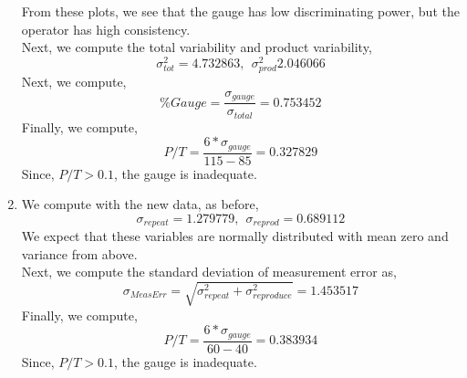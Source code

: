 \documentclass[letterpaper,10pt]{article}
\begin{document}
\begin{enumerate}
\begin{center}
\end{center}
From these plots, we see that the gauge has low discriminating power, but the operator has high consistency.\\
Next, we compute the total variability and product variability,
\[\sigma^2_{tot}=4.732863,\ \ \sigma^2_{prod}2.046066\]
Next, we compute,
\[\%Gauge=\frac{\sigma_{gauge}}{\sigma_{total}}=0.753452\]
Finally, we compute,
\[P/T=\frac{6*\sigma_{gauge}}{115-85}=0.327829\]
Since, $P/T>0.1$, the gauge is inadequate.
\item We compute with the new data, as before,
\[\sigma_{repeat}=1.279779,\ \ \sigma_{reprod}=0.689112\]
We expect that these variables are normally distributed with mean zero and variance from above.\\
Next, we compute the standard deviation of measurement error as,
\[\sigma_{MeasErr}=\sqrt{\sigma_{repeat}^2+\sigma_{reproduce}^2}=1.453517\]
Finally, we compute,
\[P/T=\frac{6*\sigma_{gauge}}{60-40}=0.383934\]
Since, $P/T>0.1$, the gauge is inadequate.
\end{enumerate}
\end{document}
